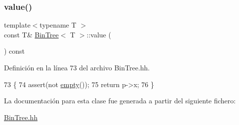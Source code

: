 \subsubsection{\texorpdfstring{value()}{value()}}
{\footnotesize\ttfamily template$<$typename T $>$ \\
const T\& \mbox{\hyperlink{class_bin_tree}{Bin\+Tree}}$<$ T $>$\+::value (\begin{DoxyParamCaption}{ }\end{DoxyParamCaption}) const}



Definición en la línea 73 del archivo Bin\+Tree.\+hh.


\begin{DoxyCode}
73                             \{
74         assert(not \mbox{\hyperlink{class_bin_tree_a74cda259ba5c25b8ee38ed4dc33e4fad}{empty}}());
75         \textcolor{keywordflow}{return} p->x;
76     \}
\end{DoxyCode}


La documentación para esta clase fue generada a partir del siguiente fichero\+:\begin{DoxyCompactItemize}
\item 
\mbox{\hyperlink{_bin_tree_8hh}{Bin\+Tree.\+hh}}\end{DoxyCompactItemize}
